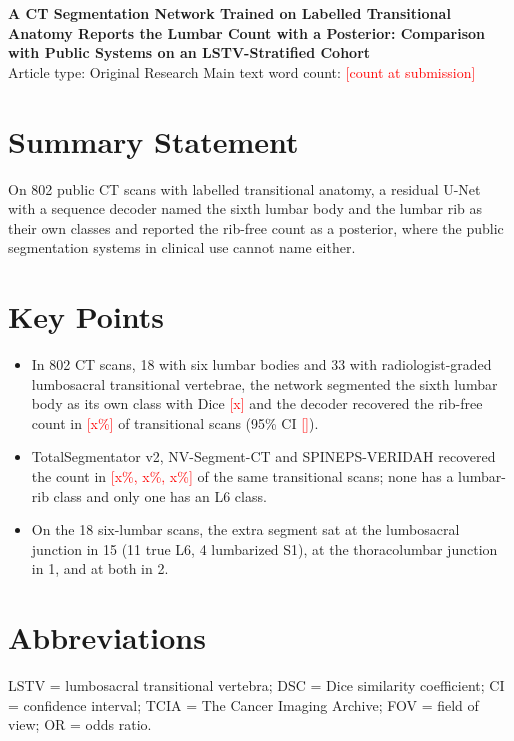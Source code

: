 \documentclass[12pt]{article}
\newcommand{\todo}[1]{\textcolor{red}{[#1]}}
\begin{document}
\begin{center}
{\large\bfseries A CT Segmentation Network Trained on Labelled Transitional Anatomy Reports the Lumbar Count with a Posterior: Comparison with Public Systems on an LSTV-Stratified Cohort}\\[6pt]
Article type: Original Research \quad Main text word count: \todo{count at submission}\\
\end{center}

\section*{Summary Statement}
On 802 public CT scans with labelled transitional anatomy, a residual U-Net with a sequence decoder named the sixth lumbar body and the lumbar rib as their own classes and reported the rib-free count as a posterior, where the public segmentation systems in clinical use cannot name either.

\section*{Key Points}
\begin{itemize}
\item In 802 CT scans, 18 with six lumbar bodies and 33 with radiologist-graded lumbosacral transitional vertebrae, the network segmented the sixth lumbar body as its own class with Dice \todo{x} and the decoder recovered the rib-free count in \todo{x\%} of transitional scans (95\% CI \todo{}).
\item TotalSegmentator v2, NV-Segment-CT and SPINEPS-VERIDAH recovered the count in \todo{x\%, x\%, x\%} of the same transitional scans; none has a lumbar-rib class and only one has an L6 class.
\item On the 18 six-lumbar scans, the extra segment sat at the lumbosacral junction in 15 (11 true L6, 4 lumbarized S1), at the thoracolumbar junction in 1, and at both in 2.
\end{itemize}

\section*{Abbreviations}
LSTV = lumbosacral transitional vertebra; DSC = Dice similarity coefficient; CI = confidence interval; TCIA = The Cancer Imaging Archive; FOV = field of view; OR = odds ratio.
\end{document}
